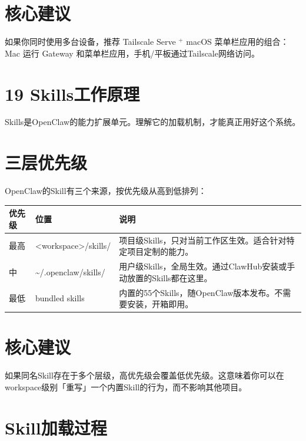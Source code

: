\documentclass[
  10
]{article}
\newcounter{none} %
\begin{document}
\section{核心建议}\label{ux6838ux5fc3ux5efaux8bae-13}

如果你同时使用多台设备，推荐 Tailscale Serve \(^ +\) macOS
菜单栏应用的组合：Mac 运行 Gateway
和菜单栏应用，手机/平板通过Tailscale网络访问。

\section{19 Skills工作原理}\label{skillsux5de5ux4f5cux539fux7406}

Skills是OpenClaw的能力扩展单元。理解它的加载机制，才能真正用好这个系统。

\section{三层优先级}\label{ux4e09ux5c42ux4f18ux5148ux7ea7}

OpenClaw的Skill有三个来源，按优先级从高到低排列：

{\def\LTcaptype{none} %
\begin{longtable}[]{@{}|l|l|l|@{}}
\toprule\noalign{}
\endhead
\bottomrule\noalign{}
\endlastfoot
\hline
优先级 & 位置 & 说明 \\
\hline
最高 & \textless workspace\textgreater/skills/ &
项目级Skills，只对当前工作区生效。适合针对特定项目定制的能力。 \\
\hline
中 & \textasciitilde/.openclaw/skills/ &
用户级Skills，全局生效。通过ClawHub安装或手动放置的Skills都在这里。 \\
\hline
最低 & bundled skills &
内置的55个Skills，随OpenClaw版本发布。不需要安装，开箱即用。 \\
\hline
\end{longtable}
}

\section{核心建议}\label{ux6838ux5fc3ux5efaux8bae-14}

如果同名Skill存在于多个层级，高优先级会覆盖低优先级。这意味着你可以在workspace级别「重写」一个内置Skill的行为，而不影响其他项目。

\section{Skill加载过程}\label{skillux52a0ux8f7dux8fc7ux7a0b}
\end{document}

